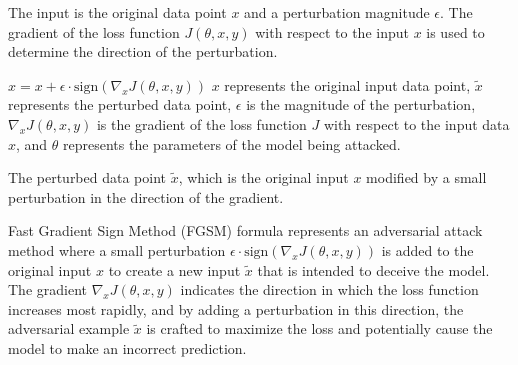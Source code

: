 The input is the original data point \(x\) and a perturbation magnitude \(\epsilon\). The gradient of the loss function \(J(\theta, x, y)\) with respect to the input \(x\) is used to determine the direction of the perturbation.

${x} = x + \epsilon \cdot \text{sign}(\nabla_x J(\theta, x, y))$
$x$ represents the original input data point,
$\tilde{x}$ represents the perturbed data point,
$\epsilon$ is the magnitude of the perturbation,
$\nabla_x J(\theta, x, y)$ is the gradient of the loss function $J$ with respect to the input data $x$, and
$\theta$ represents the parameters of the model being attacked.

The perturbed data point \(\tilde{x}\), which is the original input \(x\) modified by a small perturbation in the direction of the gradient.

Fast Gradient Sign Method (FGSM) formula represents an adversarial attack method where a small perturbation \(\epsilon \cdot \text{sign}(\nabla_x J(\theta, x, y))\) is added to the original input \(x\) to create a new input \(\tilde{x}\) that is intended to deceive the model. The gradient \(\nabla_x J(\theta, x, y)\) indicates the direction in which the loss function increases most rapidly, and by adding a perturbation in this direction, the adversarial example \(\tilde{x}\) is crafted to maximize the loss and potentially cause the model to make an incorrect prediction.
